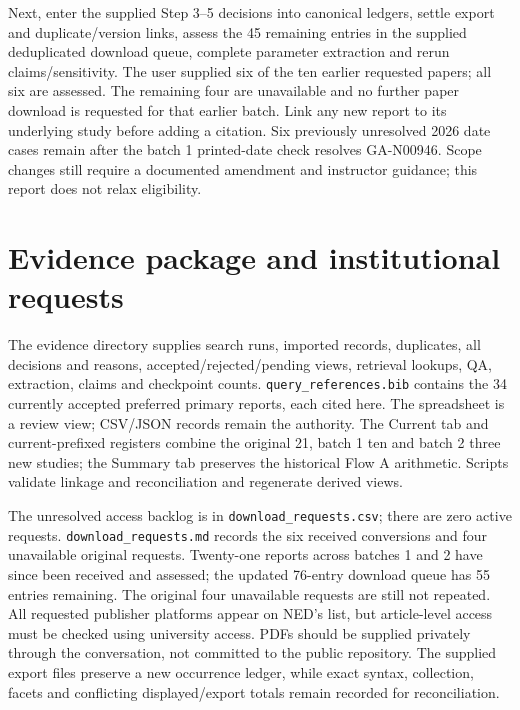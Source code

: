 \documentclass[12pt,a4paper]{article}
\begin{document}
Next, enter the supplied Step 3--5 decisions into canonical ledgers, settle export and duplicate/version links, assess the 45 remaining entries in the supplied deduplicated download queue, complete parameter extraction and rerun claims/sensitivity. The user supplied six of the ten earlier requested papers; all six are assessed. The remaining four are unavailable and no further paper download is requested for that earlier batch. Link any new report to its underlying study before adding a citation. Six previously unresolved 2026 date cases remain after the batch 1 printed-date check resolves GA-N00946. Scope changes still require a documented amendment and instructor guidance; this report does not relax eligibility.

\section{Evidence package and institutional requests}
The evidence directory supplies search runs, imported records, duplicates, all decisions and reasons, accepted/rejected/pending views, retrieval lookups, QA, extraction, claims and checkpoint counts. \texttt{query\_references.bib} contains the 34 currently accepted preferred primary reports, each cited here. The spreadsheet is a review view; CSV/JSON records remain the authority. The Current tab and current-prefixed registers combine the original 21, batch 1 ten and batch 2 three new studies; the Summary tab preserves the historical Flow A arithmetic. Scripts validate linkage and reconciliation and regenerate derived views.

The unresolved access backlog is in \texttt{download\_requests.csv}; there are zero active requests. \texttt{download\_requests.md} records the six received conversions and four unavailable original requests. Twenty-one reports across batches 1 and 2 have since been received and assessed; the updated 76-entry download queue has 55 entries remaining. The original four unavailable requests are still not repeated. All requested publisher platforms appear on NED's list, but article-level access must be checked using university access. PDFs should be supplied privately through the conversation, not committed to the public repository. The supplied export files preserve a new occurrence ledger, while exact syntax, collection, facets and conflicting displayed/export totals remain recorded for reconciliation.

\clearpage\appendix

\clearpage
\end{document}

